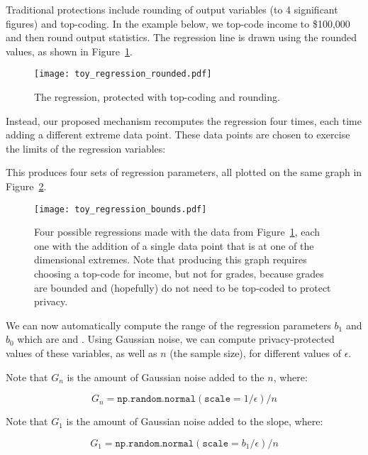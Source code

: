 \documentclass{article}
\begin{document}
Traditional protections include rounding of output variables (to 4
significant figures) and top-coding. In the example below, we top-code
income to \$100,000 and then round output statistics. The regression
line is drawn using the rounded values, as shown in Figure~\ref{protected1}.

\begin{figure}
\texttt{[image: toy\_regression\_rounded.pdf]}
\caption{The regression, protected with top-coding and
  rounding.}\label{protected1}
\end{figure}

Instead, our proposed mechanism recomputes the regression four times,
each time adding a different extreme data point. These data points are
chosen to exercise the limits of the regression variables:



This produces four sets of regression parameters, all plotted on
the same graph in Figure~\ref{protected2}.

\begin{figure}
\texttt{[image: toy\_regression\_bounds.pdf]}
\caption{Four possible regressions made with the data from
  Figure~\ref{protected1}, each one with the addition of a single data
  point that is at one of the dimensional extremes. Note that
  producing this graph requires choosing a top-code for income, but
  not for grades, because grades are bounded and (hopefully) do not
  need to be top-coded to protect privacy.}\label{protected2}
\end{figure}

We can now automatically compute the range of the regression
parameters $b_1$ and $b_0$ which are \Gzero{} and \Gone. Using Gaussian noise, we can compute 
privacy-protected values of these variables, as well as $n$ (the
sample size), for different values of $\epsilon$. 

Note that $G_n$ is the amount of Gaussian noise added to the $n$,
where:

\begin{equation}
G_n = \texttt{np.random.normal}(\texttt{scale}=1/\epsilon) / n
\end{equation}

Note that $G_1$ is the amount of Gaussian noise added to the slope,
where:

\begin{equation}
G_1 = \texttt{np.random.normal}(\texttt{scale}=b_1/\epsilon) / n
\end{equation}
\end{document}
